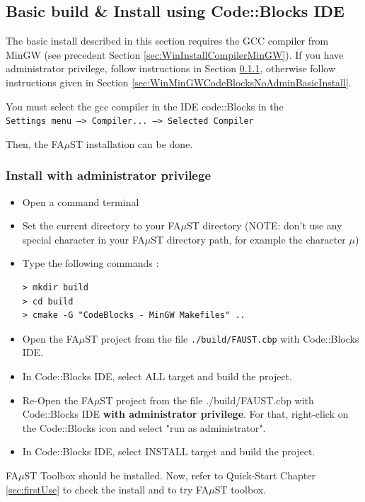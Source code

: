 \subsection{Basic build \& Install using Code::Blocks IDE}
\label{sec:WinCodeBlocksBasicInstall}

The basic install described in this section requires the GCC compiler from MinGW (see precedent Section \ref{sec:WinInstallCompilerMinGW}).
If you have administrator privilege, follow instructions in Section \ref{sec:WinMinGWCodeBlocksAdminBasicInstall}, otherwise follow instructions given in Section \ref{sec:WinMinGWCodeBlocksNoAdminBasicInstall}.

You must select the gcc compiler in the IDE code::Blocks in the \\ \texttt{Settings menu --> Compiler... --> Selected Compiler }  

Then, the FA$\mu$ST installation can be done. 

\subsubsection{Install with administrator privilege}
\label{sec:WinMinGWCodeBlocksAdminBasicInstall}
\begin{itemize}
\item Open a command terminal
\item Set the current directory to your FA$\mu$ST directory (NOTE: don't use any special character in your FA$\mu$ST directory path, for example the character $\mu$)
\item Type the following commands : 
\begin{lstlisting}
> mkdir build
> cd build
> cmake -G "CodeBlocks - MinGW Makefiles" .. 
\end{lstlisting}
\item Open the FA$\mu$ST project from the file \texttt{./build/FAUST.cbp} with Code::Blocks IDE.
\item In Code::Blocks IDE, select ALL target and build the project.
\item Re-Open the FA$\mu$ST project from the file ./build/FAUST.cbp with Code::Blocks IDE \textbf{with administrator privilege}. For that, right-click on the Code::Blocks icon and select "run as administrator". 
\item In Code::Blocks IDE, select INSTALL target and build the project.
\end{itemize}

FA$\mu$ST Toolbox should be installed. Now, refer to Quick-Start Chapter \ref{sec:firstUse} to check the install and to try FA$\mu$ST toolbox.

